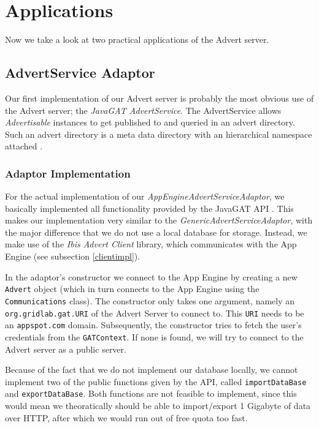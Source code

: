 \section{Applications}
\label{applications}
Now we take a look at two practical applications of the Advert server.

\subsection{AdvertService Adaptor}
\label{applications-advertservice}
Our first implementation of our Advert server is probably the most obvious use
of the Advert server; the \emph{JavaGAT AdvertService}. The AdvertService
allows \emph{Advertisable} instances to get published to and queried in an
advert directory. Such an advert directory is a meta data directory with an
hierarchical namespace attached \cite{javagat-javadoc}.

\subsubsection{Adaptor Implementation}
For the actual implementation of our \emph{AppEngineAdvertServiceAdaptor}, we
basically implemented all functionality provided by the JavaGAT API
\cite{javagat-javadoc}. This makes our implementation very similar to the
\emph{GenericAdvertServiceAdaptor}, with the major difference that we do not
use a local database for storage. Instead, we make use of the \emph{Ibis Advert
Client} library, which communicates with the App Engine (see subsection 
\ref{clientimpl}). 

In the adaptor's constructor we connect to the App Engine by creating a new
\texttt{Advert} object (which in turn connects to the App Engine using the
\texttt{Communications} class). The constructor only takes one argument, namely
an \texttt{org.gridlab.gat.URI} of the Advert Server to connect to. This
\texttt{URI} needs to be an \texttt{appspot.com} domain. Subsequently, the
constructor tries to fetch the user's credentials from the \texttt{GATContext}. 
If none is found, we will try to connect to the Advert server as a public
server.

Because of the fact that we do not implement our database locally, we cannot
implement two of the public functions given by the API, called
\texttt{importDataBase} and \texttt{exportDataBase}. Both functions are not
feasible to implement, since this would mean we theoratically should be able to
import/export 1 Gigabyte of data over HTTP, after which we would run out of
free quota too fast.

